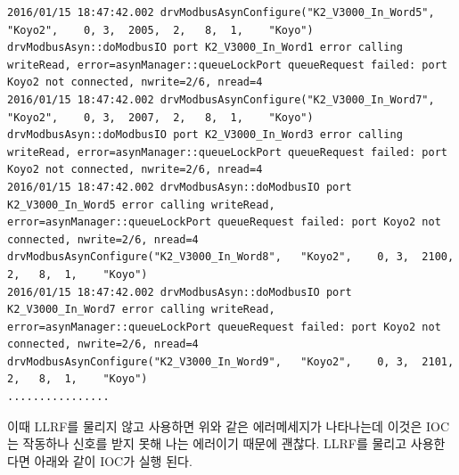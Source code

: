 \documentclass[11pt
  , a4paper
  , article
  , oneside
]{memoir}
\begin{document}
\begin{lstlisting}[style=termstyle]
2016/01/15 18:47:42.002 drvModbusAsynConfigure("K2_V3000_In_Word5",   "Koyo2",    0, 3,  2005,  2,   8,  1,    "Koyo")
drvModbusAsyn::doModbusIO port K2_V3000_In_Word1 error calling writeRead, error=asynManager::queueLockPort queueRequest failed: port Koyo2 not connected, nwrite=2/6, nread=4
2016/01/15 18:47:42.002 drvModbusAsynConfigure("K2_V3000_In_Word7",   "Koyo2",    0, 3,  2007,  2,   8,  1,    "Koyo")
drvModbusAsyn::doModbusIO port K2_V3000_In_Word3 error calling writeRead, error=asynManager::queueLockPort queueRequest failed: port Koyo2 not connected, nwrite=2/6, nread=4
2016/01/15 18:47:42.002 drvModbusAsyn::doModbusIO port K2_V3000_In_Word5 error calling writeRead, error=asynManager::queueLockPort queueRequest failed: port Koyo2 not connected, nwrite=2/6, nread=4
drvModbusAsynConfigure("K2_V3000_In_Word8",   "Koyo2",    0, 3,  2100,  2,   8,  1,    "Koyo")
2016/01/15 18:47:42.002 drvModbusAsyn::doModbusIO port K2_V3000_In_Word7 error calling writeRead, error=asynManager::queueLockPort queueRequest failed: port Koyo2 not connected, nwrite=2/6, nread=4
drvModbusAsynConfigure("K2_V3000_In_Word9",   "Koyo2",    0, 3,  2101,  2,   8,  1,    "Koyo")
................
\end{lstlisting}
이때 LLRF를 물리지 않고 사용하면 위와 같은 에러메세지가 나타나는데 이것은 IOC는 작동하나 신호를 받지 못해 나는 에러이기 때문에 괜찮다. LLRF를 물리고 사용한다면 아래와 같이 IOC가 실행 된다.
\end{document}
